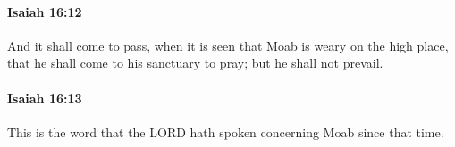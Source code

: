 		\paragraph{Isaiah 16:12} %
			\label{ISAIAH-16-12}

			And it shall come to pass, when it is seen that Moab is weary on the high place, that he shall come to his sanctuary to pray; but he shall not prevail.


		\paragraph{Isaiah 16:13} %
			\label{ISAIAH-16-13}

			This is the word that the LORD hath spoken concerning Moab since that time.


